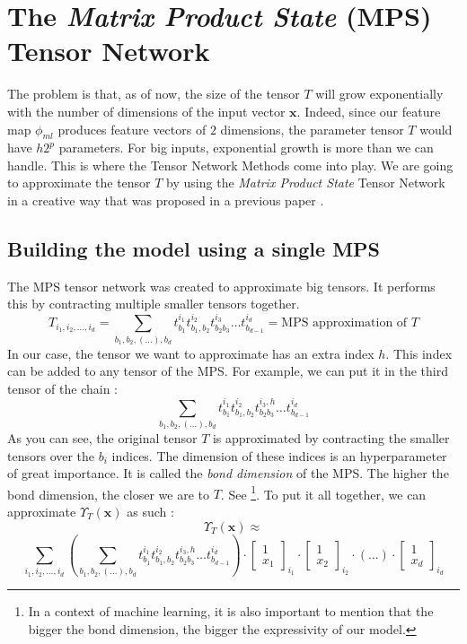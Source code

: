 \documentclass{article}
\theoremstyle{definition}
\theoremstyle{definition}
\begin{document}
\section{The \emph{Matrix Product State} (MPS) Tensor Network}
The problem is that, as of now, the size of the tensor $T$ will grow exponentially with the number of dimensions of the input vector $\mathbf{x}$. Indeed, since our feature map $\phi_{ml}$ produces feature vectors of $2$ dimensions, the parameter tensor $T$ would have $h2^p$ parameters. For big inputs, exponential growth is more than we can handle. This is where the Tensor Network Methods come into play. We are going to approximate the tensor $T$ by using the \emph{Matrix Product State} Tensor Network in a creative way that was proposed in a previous paper \cite{stoudenmire2017supervised}.
\subsection{Building the model using a single MPS}
The MPS tensor network was created to approximate big tensors. It performs this by contracting multiple smaller tensors together.
\begin{equation} \label{eq:mps_approx}
T_{i_1, i_2, \dots, i_d} 
= 
\sum_{b_1,b_2,(\dots), b_d} t^{i_1}_{b_1} t^{i_2}_{b_1, b_2} t^{i_3}_{b_2 b_3} \dots  t^{i_d}_{ b_{d-1} } 
= \text{MPS approximation of $T$}
\end{equation}
In our case, the tensor we want to approximate has an extra index $h$. This index can be added to any tensor of the MPS. For example, we can put it in the third tensor of the chain :
\[
    \sum_{b_1,b_2,(\dots), b_d} t^{i_1}_{b_1} t^{i_2}_{b_1, b_2} t^{i_3, h}_{b_2 b_3} \dots  t^{i_d}_{ b_{d-1} } 
\]
As you can see, the original tensor $T$ is approximated by contracting the smaller tensors over the $b_i$ indices. The dimension of these indices is an hyperparameter of great importance. It is called the \emph{bond dimension} of the MPS. The higher the bond dimension, the closer we are to $T$. See \footnote{In a context of machine learning, it is also important to mention that the bigger the bond dimension, the bigger the expressivity of our model.}. To put it all together, we can approximate $\Upsilon_T(\mathbf{x})$ as such :
\[
    \Upsilon_T(\mathbf{x}) \approx
\]
\[
    \sum_{i_1, i_2, \dots, i_d}
    \left(
    \sum_{b_1,b_2,(\dots), b_d} t^{i_1}_{b_1} t^{i_2}_{b_1, b_2} t^{i_3, h}_{b_2 b_3} \dots  t^{i_d}_{ b_{d-1} } 
    \right)
    \cdot
    \begin{bmatrix}
        1 \\ x_1
    \end{bmatrix}_{i_1}
    \cdot
    \begin{bmatrix}
        1 \\ x_2
    \end{bmatrix}_{i_2}
    \cdot
    (\dots)
    \cdot
    \begin{bmatrix}
        1 \\ x_d
    \end{bmatrix}_{i_d}
\]
\end{document}
